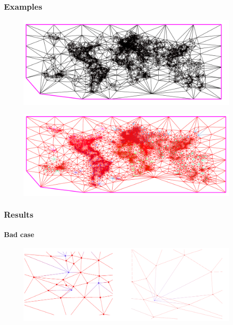 \begin{frame}
\frametitle{Examples}
\begin{exampleblock}{}
\begin{figure}[!h]
\centering
\includegraphics[scale=0.2]{../rapport/img/aiir_traffic_origin.png}
\end{figure}
\end{exampleblock}{}
\pause
\begin{exampleblock}{}
\begin{figure}[!h]
\centering
\includegraphics[scale=0.2]{../rapport/img/aiir_traffic_tutted.png}
\end{figure}
\end{exampleblock}{}
\end{frame}

\begin{frame}
\frametitle{Results}
\framesubtitle{Bad case}
\begin{exampleblock}{}
\begin{figure}[!h]
\centering
\includegraphics[scale=0.4]{../rapport/img/bad_case.png}
\end{figure}
\end{exampleblock}{}
\end{frame}

